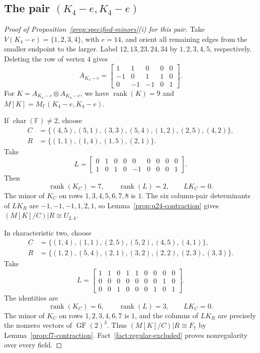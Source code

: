 \documentclass[12pt,a4paper]{article}
\numberwithin{equation}{section}
\DeclareMathOperator{\rank}{rank}
\newcommand{\F}{\mathbb F}
\theoremstyle{definition}
\theoremstyle{remark}
\begin{document}
\subsection{The pair \texorpdfstring{\((K_4-e,K_4-e)\)}{(K4-e,K4-e)}}
\begin{proof}[Proof of Proposition~\ref{prop:specified-minors}\textup{(i)} for this pair]
Take \(V(K_4-e)=\{1,2,3,4\}\), with \(e=14\), and orient
all remaining edges from the smaller endpoint to the larger.
Label \(12,13,23,24,34\) by \(1,2,3,4,5\), respectively.
Deleting the row of vertex \(4\) gives
\[
 A_{K_4-e}=\begin{bmatrix}
 1&1&0&0&0\\-1&0&1&1&0\\0&-1&-1&0&1
 \end{bmatrix}.
\]
For \(K=A_{K_4-e}\otimes A_{K_4-e}\), we have
\(\rank(K)=9\) and \(M[K]=M_{\F}(K_4-e,K_4-e)\).

If \(\operatorname{char}(\F)\ne2\), choose
\[
\begin{aligned}
 C&=\{(4,5),(5,1),(3,3),(5,4),(1,2),(2,5),(4,2)\},\\
 R&=\{(1,1),(1,4),(1,5),(2,1)\}.
\end{aligned}
\]
Take
\[
 L=\begin{bmatrix}
0&1&0&0&0&0&0&0&0\\
1&0&1&0&-1&0&0&0&1
\end{bmatrix}.
\]
Then
\[
 \rank(K_C)=7,\qquad \rank(L)=2,\qquad LK_C=0.
\]
The minor of \(K_C\) on rows \(1,3,4,5,6,7,8\) is \(1\).
The six column-pair determinants of \(LK_R\) are
\(-1,-1,-1,1,2,1\), so Lemma~\ref{prop:u24-contraction} gives
\((M[K]/C)|R\cong U_{2,4}\).

In characteristic two, choose
\[
\begin{aligned}
 C&=\{(1,4),(1,1),(2,5),(5,2),(4,5),(4,1)\},\\
 R&=\{(1,2),(5,4),(2,1),(3,2),(2,2),(2,3),(3,3)\}.
\end{aligned}
\]
Take
\[
 L=\begin{bmatrix}
1&1&0&1&1&0&0&0&0\\
0&0&0&0&0&0&0&1&0\\
0&0&1&0&0&0&1&0&1
\end{bmatrix}.
\]
The identities are
\[
 \rank(K_C)=6,\qquad \rank(L)=3,\qquad LK_C=0.
\]
The minor of \(K_C\) on rows \(1,2,3,4,6,7\) is \(1\), and the
columns of \(LK_R\) are precisely the nonzero vectors of
\(\operatorname{GF}(2)^3\).  Thus
\((M[K]/C)|R\cong F_7\) by Lemma~\ref{prop:f7-contraction}.
Fact~\ref{fact:regular-excluded} proves nonregularity over every field.
\end{proof}
\end{document}
